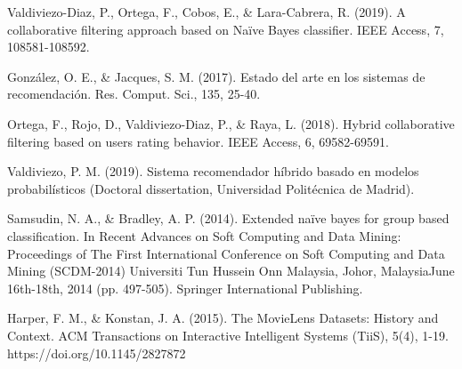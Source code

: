 \documentclass[twocolumn, fontsize=10pt]{article}
\begin{document}
\begin{thebibliography}{}

    Valdiviezo-Diaz, P., Ortega, F., Cobos, E., \& Lara-Cabrera, R. (2019). A collaborative filtering approach based on Naïve Bayes classifier. IEEE Access, 7, 108581-108592.
    
    González, O. E., \& Jacques, S. M. (2017). Estado del arte en los sistemas de recomendación. Res. Comput. Sci., 135, 25-40.
    
    Ortega, F., Rojo, D., Valdiviezo-Diaz, P., \& Raya, L. (2018). Hybrid collaborative filtering based on users rating behavior. IEEE Access, 6, 69582-69591.
    
    Valdiviezo, P. M. (2019). Sistema recomendador híbrido basado en modelos probabilísticos (Doctoral dissertation, Universidad Politécnica de Madrid).

    Samsudin, N. A., \& Bradley, A. P. (2014). Extended naïve bayes for group based classification. In Recent Advances on Soft Computing and Data Mining: Proceedings of The First International Conference on Soft Computing and Data Mining (SCDM-2014) Universiti Tun Hussein Onn Malaysia, Johor, MalaysiaJune 16th-18th, 2014 (pp. 497-505). Springer International Publishing.

    Harper, F. M., \& Konstan, J. A. (2015). The MovieLens Datasets: History and Context. ACM Transactions on Interactive Intelligent Systems (TiiS), 5(4), 1-19. https://doi.org/10.1145/2827872
    
\end{thebibliography}
    
    
\end{document}

